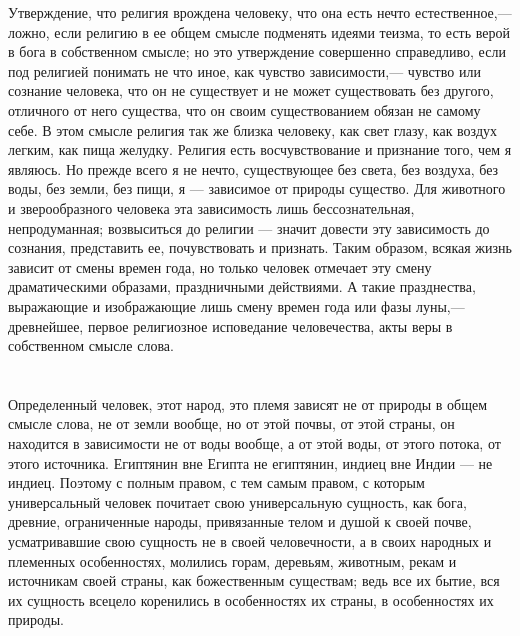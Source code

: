 \documentclass[12pt]{article}
\begin{document}
Утверждение, что религия врождена человеку, что она есть нечто естественное,--- ложно, если религию в ее общем смысле подменять идеями теизма, то есть верой в бога в собственном смысле; но это утверждение совершенно справедливо, если под религией понимать не что иное, как чувство зависимости,--- чувство или сознание человека, что он не существует и не может существовать без другого, отличного от него существа, что он своим существованием обязан не самому себе. В этом смысле религия так же близка человеку, как свет глазу, как воздух легким, как пища желудку. Религия есть восчувствование и признание того, чем я являюсь. Но прежде всего я не нечто, существующее без света, без воздуха, без воды, без земли, без пищи, я --- зависимое от природы существо. Для животного и зверообразного человека эта зависимость лишь бессознательная, непродуманная; возвыситься до религии --- значит довести эту зависимость до сознания, представить ее, почувствовать и признать. Таким образом, всякая жизнь зависит от смены времен года, но только человек отмечает эту смену драматическими образами, праздничными действиями. А такие празднества, выражающие и изображающие лишь смену времен года или фазы луны,--- древнейшее, первое религиозное исповедание человечества, акты веры в собственном смысле слова.



\section{}

Определенный человек, этот народ, это племя зависят не от природы в общем смысле слова, не от земли вообще, но от этой почвы, от этой страны, он находится в зависимости не от воды вообще, а от этой воды, от этого потока, от этого источника. Египтянин вне Египта не египтянин, индиец вне Индии --- не индиец. Поэтому с полным правом, с тем самым правом, с которым универсальный человек почитает свою универсальную сущность, как бога, древние, ограниченные народы, привязанные телом и душой к своей почве, усматривавшие свою сущность не в своей человечности, а в своих народных и племенных особенностях, молились горам, деревьям, животным, рекам и источникам своей страны, как божественным существам; ведь все их бытие, вся их сущность всецело коренились в особенностях их страны, в особенностях их природы.



\section{}
\end{document}
